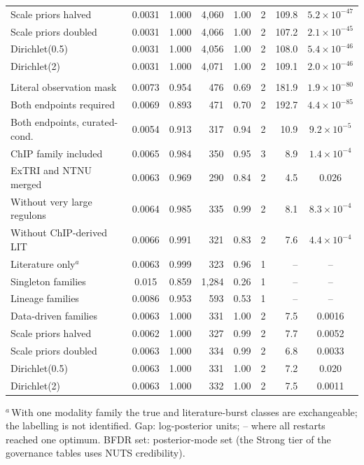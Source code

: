 \begin{table}[htbp]
\begin{tabular}{@{}lccrcrrc@{}}
\addlinespace[2pt]
Scale priors halved & 0.0031 & 1.000 & 4{,}060 & 1.00 & 2 & 109.8 & $5.2\times 10^{-47}$ \\
Scale priors doubled & 0.0031 & 1.000 & 4{,}066 & 1.00 & 2 & 107.2 & $2.1\times 10^{-45}$ \\
Dirichlet(0.5) & 0.0031 & 1.000 & 4{,}056 & 1.00 & 2 & 108.0 & $5.4\times 10^{-46}$ \\
Dirichlet(2) & 0.0031 & 1.000 & 4{,}071 & 1.00 & 2 & 109.1 & $2.0\times 10^{-46}$ \\
\addlinespace[3pt]
\multicolumn{8}{@{}l}{\emph{Immune universe (primary: $w_{\mathrm T}$ = 0.0063, BFDR set 331 edges)}} \\
Literal observation mask & 0.0073 & 0.954 & 476 & 0.69 & 2 & 181.9 & $1.9\times 10^{-80}$ \\
Both endpoints required & 0.0069 & 0.893 & 471 & 0.70 & 2 & 192.7 & $4.4\times 10^{-85}$ \\
Both endpoints, curated-cond. & 0.0054 & 0.913 & 317 & 0.94 & 2 & 10.9 & $9.2\times 10^{-5}$ \\
ChIP family included & 0.0065 & 0.984 & 350 & 0.95 & 3 & 8.9 & $1.4\times 10^{-4}$ \\
ExTRI and NTNU merged & 0.0063 & 0.969 & 290 & 0.84 & 2 & 4.5 & 0.026 \\
Without very large regulons & 0.0064 & 0.985 & 335 & 0.99 & 2 & 8.1 & $8.3\times 10^{-4}$ \\
Without ChIP-derived LIT & 0.0066 & 0.991 & 321 & 0.83 & 2 & 7.6 & $4.4\times 10^{-4}$ \\
Literature only$^{a}$ & 0.0063 & 0.999 & 323 & 0.96 & 1 & -- & -- \\
\addlinespace[2pt]
Singleton families & 0.015 & 0.859 & 1{,}284 & 0.26 & 1 & -- & -- \\
Lineage families & 0.0086 & 0.953 & 593 & 0.53 & 1 & -- & -- \\
Data-driven families & 0.0063 & 1.000 & 331 & 1.00 & 2 & 7.5 & 0.0016 \\
\addlinespace[2pt]
Scale priors halved & 0.0062 & 1.000 & 327 & 0.99 & 2 & 7.7 & 0.0052 \\
Scale priors doubled & 0.0063 & 1.000 & 334 & 0.99 & 2 & 6.8 & 0.0033 \\
Dirichlet(0.5) & 0.0063 & 1.000 & 331 & 1.00 & 2 & 7.2 & 0.020 \\
Dirichlet(2) & 0.0063 & 1.000 & 332 & 1.00 & 2 & 7.5 & 0.0011 \\
\bottomrule
\end{tabular}
\par\smallskip
\begin{minipage}{\linewidth}\footnotesize
$^{a}$\,With one modality family the true and literature-burst classes are exchangeable; the labelling is not identified. Gap: log-posterior units; -- where all restarts reached one optimum. BFDR set: posterior-mode set (the Strong tier of the governance tables uses NUTS credibility).


\end{minipage}
\end{table}
